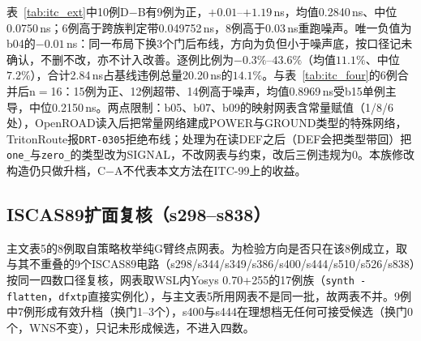 \documentclass[twocolumn,10pt,fontset=windows]{ctexart}
\begin{document}
表~\ref{tab:itc_ext}中10例D$-$B有9例为正，$+0.01$--$+1.19$\,ns，均值0.2840\,ns、中位0.0750\,ns；6例高于跨族判定带0.049752\,ns，8例高于0.03\,ns重跑噪声。唯一负值为b04的$-0.01$\,ns：同一布局下换3个门后布线，方向为负但小于噪声底，按口径记未确认，不删不改，亦不计入改善。逐例比例为$-0.3\%$--$43.6\%$（均值$11.1\%$、中位$7.2\%$），合计2.84\,ns占基线违例总量20.20\,ns的$14.1\%$。与表~\ref{tab:itc_four}的6例合并后n$=$16：15例为正、12例超带、14例高于噪声，均值0.8969\,ns受b15单例主导，中位0.2150\,ns。两点限制：b05、b07、b09的映射网表含常量赋值（1/8/6处），OpenROAD读入后把常量网络建成POWER与GROUND类型的特殊网络，TritonRoute报\texttt{DRT-0305}拒绝布线；处理为在读DEF之后（DEF会把类型带回）把\texttt{one\_}与\texttt{zero\_}的类型改为SIGNAL，不改网表与约束，改后三例违规为0。本族修改构造仍只做升档，C$-$A不代表本文方法在ITC-99上的收益。

\subsection{ISCAS89扩面复核（s298--s838）}\label{sec:iscas_ext}

主文表5的8例取自策略枚举纯G臂终点网表。为检验方向是否只在该8例成立，取与其不重叠的9个ISCAS89电路（s298/s344/s349/s386/s400/s444/s510/s526/s838）按同一四数口径复核，网表取WSL内Yosys 0.70+255的17例族（\texttt{synth -flatten}，\texttt{dfxtp}直接实例化），与主文表5所用网表不是同一批，故两表不并。9例中7例形成有效升档（换门1--3个），s400与s444在理想档无任何可接受候选（换门0个，WNS不变），只记未形成候选，不进入四数。
\end{document}
